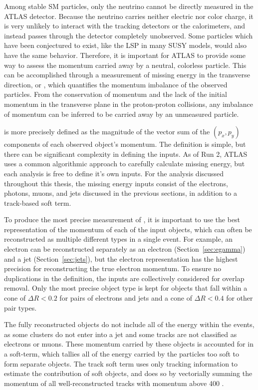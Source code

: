 Among stable \ac{SM} particles, only the neutrino cannot be directly measured in the \ac{ATLAS} detector. 
Because the neutrino carries neither electric nor color charge, it is very unlikely to interact with the tracking detectors or the calorimeters, and instead passes through the detector completely unobserved.
Some particles which have been conjectured to exist, like the \ac{LSP} in many \ac{SUSY} models, would also have the same behavior.
Therefore, it is important for \ac{ATLAS} to provide some way to assess the momentum carried away by a neutral, colorless particle.
This can be accomplished through a measurement of missing energy in the transverse direction, or \met, which quantifies the momentum imbalance of the observed particles.
From the conservation of momentum and the lack of the initial momentum in the transverse plane in the proton-proton collisions, any imbalance of momentum can be inferred to be carried away by an unmeasured particle.

\met is more precisely defined as the magnitude of the vector sum of the $(p_x,p_y)$ components of each observed object's momentum.
The definition is simple, but there can be significant complexity in defining the inputs.
As of Run 2, \ac{ATLAS} uses a common algorithmic approach to carefully calculate missing energy, but each analysis is free to define it's own inputs.
For the analysis discussed throughout this thesis, the missing energy inputs consist of the electrons, photons, muons, and jets discussed in the previous sections, in addition to a track-based soft term.

To produce the most precise measurement of \met, it is important to use the best representation of the momentum of each of the input objects, which can often be reconstructed as multiple different types in a single event.
For example, an electron can be reconstructed separately as an electron (Section~\ref{sec:egamma}) and a jet (Section~\ref{sec:jets}), but the electron representation has the highest precision for reconstructing the true electron momentum.
To ensure no duplications in the \met definition, the inputs are collectively considered for overlap removal.
Only the most precise object type is kept for objects that fall within a cone of $\Delta R < 0.2$ for pairs of electrons and jets and a cone of $\Delta R < 0.4$ for other pair types.

The fully reconstructed objects do not include all of the energy within the events, as some clusters do not enter into a jet and some tracks are not classified as electrons or muons.
These momentum carried by these objects is accounted for in a soft-term, which tallies all of the energy carried by the particles too soft to form separate objects.
The track soft term uses only tracking information to estimate the contribution of soft objects, and does so by vectorially summing the momentum of all well-reconstructed tracks with momentum above 400 \MeV.

